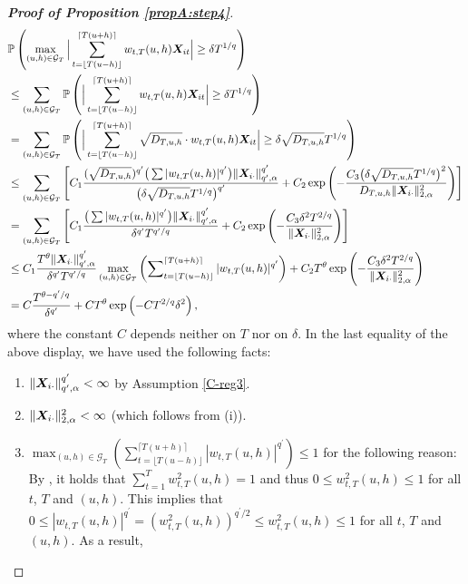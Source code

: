 \documentclass[12pt]{article}
\makeatletter
\renewcommand{\eqref}[1]{\tagform@{\ref{#1}}}
\makeatother
\begin{document}
\begin{proof}[\textnormal{\textbf{Proof of Proposition \ref{propA:step4}}}]
\begin{align}
&\mathbb{P}\left(\max_{(u, h) \in \mathcal{G}_T} \Big| \sum_{t=\lfloor T(u-h) \rfloor}^{\lceil T(u+h) \rceil} w_{t,T}(u,h) \boldsymbol{X}_{it}  \Big| \geq \delta T^{1/q} \right) \nonumber \\
&\leq \sum_{(u, h) \in \mathcal{G}_T} \mathbb{P} \left( \Big| \sum_{t=\lfloor T(u-h) \rfloor}^{\lceil T(u+h) \rceil} w_{t,T}(u,h) \boldsymbol{X}_{it}  \Big| \geq \delta T^{1/q} \right) \nonumber \\
&= \sum_{(u, h) \in \mathcal{G}_T} \mathbb{P} \left( \Big| \sum_{t=\lfloor T(u-h) \rfloor}^{\lceil T(u+h) \rceil} \sqrt{D_{T, u, h}}\cdot w_{t,T}(u,h) \boldsymbol{X}_{it}  \Big| \geq \delta\sqrt{D_{T, u, h}}T^{1/q}  \right) \nonumber \\
&\leq \sum_{(u, h) \in \mathcal{G}_T} \left[C_1 \frac{(\sqrt{D_{T, u, h}})^{q^\prime}\big( \sum |w_{t,T}(u,h)|^{q^\prime}\big) \| \boldsymbol{X}_{i\cdot}\|^{q^\prime}_{q^\prime, \alpha}}{ \big(\delta\sqrt{D_{T, u, h}}T^{1/q}\big)^{q^\prime}} + C_2 \exp \left(-\frac{C_3 \big(\delta\sqrt{D_{T, u, h}}T^{1/q} \big)^2}{D_{T, u, h}\| \boldsymbol{X}_{i\cdot}\|^{2}_{2, \alpha}}\right) \right] \nonumber \\
&= \sum_{(u, h) \in \mathcal{G}_T} \left[C_1 \frac{\big( \sum |w_{t,T}(u,h)|^{q^\prime}\big) \| \boldsymbol{X}_{i\cdot}\|^{q^\prime}_{q^\prime, \alpha}}{\delta^{q^\prime}T^{q^\prime/q} } + C_2 \exp \left(-\frac{C_3 \delta^2 T^{2/q} }{\|\boldsymbol{X}_{i\cdot}\|^{2}_{2, \alpha}}\right) \right] \nonumber \\
&\leq C_1 \frac{ T^\theta \|\boldsymbol{X}_{i\cdot}\|^{q^\prime}_{q^\prime, \alpha}}{\delta^{q^\prime} T^{q^\prime/q}} \max_{(u, h) \in \mathcal{G}_T} \left( \sum\nolimits_{t=\lfloor T(u-h) \rfloor}^{\lceil T(u+h) \rceil} |w_{t,T}(u,h)|^{q^\prime}\right)+ C_2 T^\theta \exp \left(-\frac{C_3 \delta^2 T^{2/q}}{\|\boldsymbol{X}_{i\cdot}\|^{2}_{2, \alpha}}\right) \nonumber \\
&= C \frac{ T^{\theta - q^\prime/q}}{\delta^{q^\prime}} + C T^\theta \exp \left(-C T^{2/q} \delta^2\right), \label{eq:exp-bound-BnT}
\end{align}
where the constant $C$ depends neither on $T$ nor on $\delta$. In the last equality of the above display, we have used the following facts:
\begin{enumerate}[label=(\roman*),leftmargin=0.85cm]
\item $\|\boldsymbol{X}_{i\cdot}\|^{q^\prime}_{q^\prime, \alpha}  < \infty$ by Assumption \ref{C-reg3}.
\item $\|\boldsymbol{X}_{i\cdot}\|^{2}_{2, \alpha} < \infty$ (which follows from (i)).
\item $\max_{(u, h) \in \mathcal{G}_T} ( \sum_{t=\lfloor T(u-h) \rfloor}^{\lceil T(u+h) \rceil} |w_{t,T}(u,h)|^{q^\prime} ) \leq 1$ for the following reason: By \eqref{eq:sum_weights}, it holds that $\sum_{t=1}^{T} w^2_{t,T}(u,h) = 1$ and thus $0 \leq w^2_{t,T}(u,h) \leq 1$ for all $t$, $T$ and $(u, h)$. This implies that $0 \leq |w_{t,T}(u,h)|^{q^\prime} =  (w^2_{t,T}(u,h))^{q^\prime/2} \leq w^2_{t,T}(u,h) \leq 1$ for all $t$, $T$ and $(u, h)$. As a result, 

\end{enumerate}
\end{proof}
\end{document}
